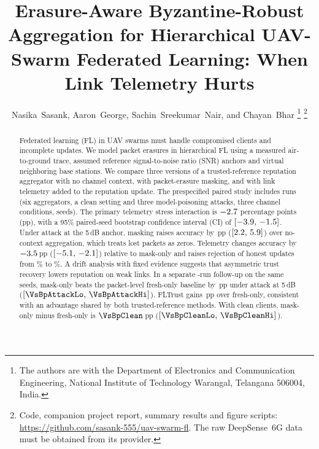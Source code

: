 \documentclass[journal]{IEEEtran}
\newcommand{\pp}{\,pp}
\newcommand{\ci}[2]{$[#1,\,#2]$}
\begin{document}
\title{Erasure-Aware Byzantine-Robust Aggregation for Hierarchical UAV-Swarm Federated Learning: When Link Telemetry Hurts}

\author{%
  Nasika~Sasank, Aaron~George, Sachin~Sreekumar~Nair, and Chayan~Bhar%
  \thanks{The authors are with the Department of Electronics and Communication Engineering,
  National Institute of Technology Warangal, Telangana 506004, India.}%
  \thanks{Code, companion project report, summary results and figure scripts:
  \url{https://github.com/sasank-555/uav-swarm-fl}. The raw DeepSense~6G data must be
  obtained from its provider.}%
}

\maketitle

\begin{abstract}
Federated learning (FL) in UAV swarms must handle compromised clients and incomplete
updates. We model packet erasures in hierarchical FL using a measured air-to-ground
trace, assumed reference signal-to-noise ratio (SNR) anchors and virtual neighboring
base stations. We compare three versions of a trusted-reference reputation aggregator
with no channel context, with packet-erasure masking, and with link telemetry added
to the reputation update. The prespecified paired study includes \NumRuns{} runs
(six aggregators, a clean setting and three model-poisoning attacks, three channel
conditions, \NumSeeds{} seeds). The primary telemetry stress interaction is
$-2.7$ percentage points (pp), with a 95\% paired-seed bootstrap confidence
interval (CI) of \ci{\PrimLo}{\PrimHi}. Under attack at the 5\,dB anchor, masking
raises accuracy by \MaskGain\pp{} (\ci{\MaskLo}{\MaskHi}) over no-context aggregation,
which treats lost packets as zeros. Telemetry changes accuracy by
$-3.5$\pp{} (\ci{\TelLo}{\TelHi}) relative to mask-only and raises rejection of
honest updates from \RejMask\% to \RejCcra\%. A drift analysis with fixed evidence
suggests that asymmetric trust recovery lowers reputation on weak links.
In a separate \BpNumRuns-run follow-up on the same seeds, mask-only beats the
packet-level fresh-only baseline by \VsBpAttack\pp{} under attack at 5\,dB
(\ci{\VsBpAttackLo}{\VsBpAttackHi}). FLTrust gains \FltVsBpAttack\pp{} over fresh-only,
consistent with an advantage shared by both trusted-reference methods. With clean
clients, mask-only minus fresh-only is $\VsBpClean$\pp{}
(\ci{\VsBpCleanLo}{\VsBpCleanHi}).
\end{abstract}
\end{document}
